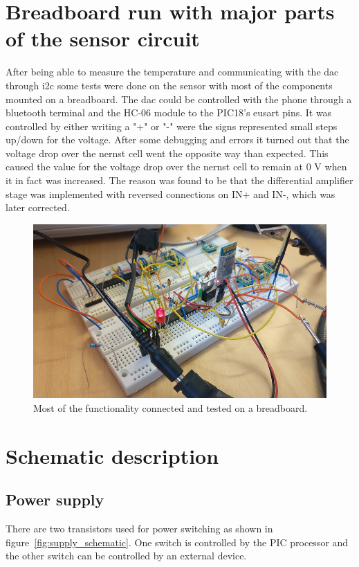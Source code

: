 \section{Breadboard run with major parts of the sensor circuit}

After being able to measure the temperature and communicating with the \ac{dac} through \ac{i2c} some tests were done on the sensor with most of the components mounted on a breadboard. The \ac{dac} could be controlled with the phone through a bluetooth terminal and the HC-06 module to the PIC18's eusart pins. It was controlled by either writing a "+" or "-" were the signs represented small steps up/down for the voltage. After some debugging and errors it turned out that the voltage drop over the nernst cell went the opposite way than expected. This caused the value for the voltage drop over the nernst cell to remain at 0 V when it in fact was increased. The reason was found to be that the differential amplifier stage was implemented with reversed connections on IN+ and IN-, which was later corrected.

\begin{figure}
    \centering
    \includegraphics[width=.6\textwidth]{Figures/breadboard.png}
    \caption{Most of the functionality connected and tested on a breadboard.}
    \label{fig:breadboard}
\end{figure}


\section{Schematic description}

\subsection{Power supply}

There are two transistors used for power switching as shown in figure~\ref{fig:supply_schematic}. One switch is controlled by the PIC processor and the other switch can be controlled by an external device.

